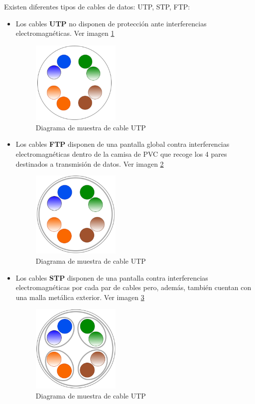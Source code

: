 Existen diferentes tipos de cables de datos: UTP, STP, FTP:
\begin{itemize}
\item Los cables \textbf{UTP} no disponen de protección ante interferencias electromagnéticas. Ver imagen \ref{Img:Muestra UTP}

\begin{figure}
    \centering
    \includegraphics[width=0.4\textwidth]{img/UTP.pdf}
    \caption{Diagrama de muestra de cable UTP} \label{Img:Muestra UTP}
\end{figure}
  

\item Los cables \textbf{FTP} disponen de una pantalla global contra interferencias electromagnéticas dentro de la camisa de PVC que recoge los 4 pares destinados a transmisión de datos. Ver imagen \ref{Img:Muestra FTP}

\begin{figure}
    \centering
    \includegraphics[width=0.4\textwidth]{img/FTP.pdf}
    \caption{Diagrama de muestra de cable UTP} \label{Img:Muestra FTP}
\end{figure}

\item Los cables \textbf{STP} disponen de una pantalla contra interferencias electromagnéticas por cada par de cables pero, además, también cuentan con una malla metálica exterior. Ver imagen \ref{Img:Muestra STP}
\begin{figure}
    \centering
    \includegraphics[width=0.4\textwidth]{img/STP.pdf}
    \caption{Diagrama de muestra de cable UTP} \label{Img:Muestra STP}
\end{figure}


\end{itemize}
